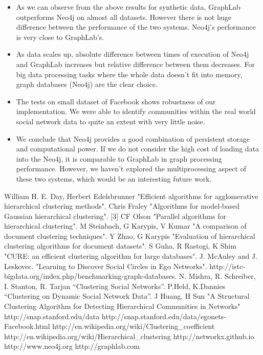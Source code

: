 \documentclass[11pt,onecolumn]{article}
\begin{document}





\begin{itemize}
\item As we can observe from the above results for synthetic data, GraphLab outperforms Neo4j on almost all datasets. However there is not huge difference between the performance of the two systems. Neo4j's performance is very close to GraphLab's.
\item As data scales up, absolute difference between times of execution of Neo4j and GraphLab increases but relative difference between them decreases. For big data processing tasks where the whole data doesn't fit into memory, graph databases (Neo4j) are the clear choice.
\item The tests on small dataset of Facebook shows robustness of our implementation. We were able to identify communities within the real world social network data to quite an extent with very little noise.
\item We conclude that Neo4j provides a good combination of persistent storage and computational power. If we do not consider the high cost of loading data into the Neo4j, it is comparable to GraphLab in graph processing performance. However, we haven't explored the multiprocessing aspect of these two systems, which would be an interesting future work.
\end{itemize}
\begin{thebibliography}{1}
\small
{} William H. E. Day, Herbert Edelsbrunner "Efficient algorithms for agglomerative hierarchical clustering methods".
Chris Fraley "Algorithms for model-based Gaussian hierarchical clustering".
[3] CF Olson "Parallel algorithms for hierarchical clustering".
M Steinbach, G Karypis, V Kumar "A comparison of document clustering techniques".
Y Zhao, G Karypis "Evaluation of hierarchical clustering algorithms for document datasets".
S Guha, R Rastogi, K Shim "CURE: an efficient clustering algorithm for large databases".
J. McAuley and J. Leskovec. "Learning to Discover Social Circles in Ego Networks".
http://istc-bigdata.org/index.php/benchmarking-graph-databases.
N. Mishra, R. Schreiber, I. Stanton, R. Tarjan “Clustering Social Networks”.
P.Held, K.Dannies “Clustering on Dynamic Social Network Data”.
 J Huang, H Sun "A Structural Clustering Algorithm for Detecting Hierarchical Communities in Networks"
 http://snap.stanford.edu/data
 http://snap.stanford.edu/data/egonets-Facebook.html
 http://en.wikipedia.org/wiki/Clustering\_coefficient
 http://en.wikipedia.org/wiki/Hierarchical\_clustering
 http://networkx.github.io
 http://www.neo4j.org
 http://graphlab.com

\end{thebibliography}
\end{document}
